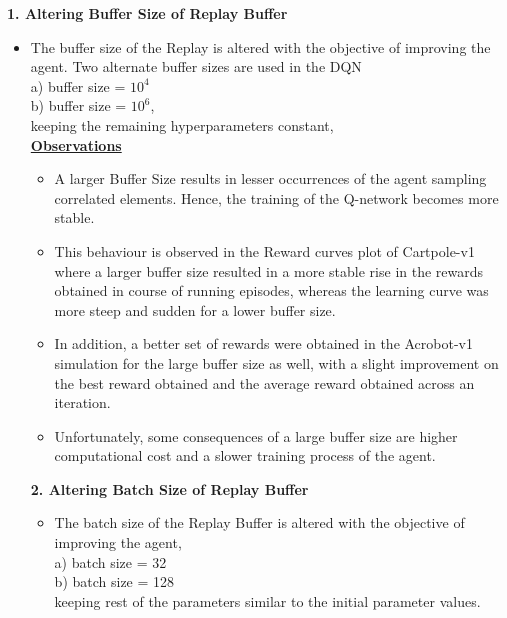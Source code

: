 \documentclass{article}
\begin{document}
    \textbf{ 1. Altering Buffer Size of Replay Buffer} \\
    \begin{itemize}
        \item The buffer size of the Replay is altered with the objective of improving
        the agent. Two alternate buffer sizes are used in the DQN \\
        a) buffer size = $10^4$ \\
        b) buffer size = $10^6$, \\keeping the
        remaining hyperparameters constant,\\


        \textbf{\underline{Observations}}
        \begin{itemize}
            \item A larger Buffer Size results in lesser occurrences of the agent sampling
            correlated elements. Hence, the training of the Q-network becomes more
            stable.
            \item This behaviour is observed in the Reward curves plot of Cartpole-v1 where
            a larger buffer size resulted in a more stable rise in the rewards obtained
            in course of running episodes, whereas the learning curve was more steep
            and sudden for a lower buffer size.
            \item In addition, a better set of rewards were obtained in the Acrobot-v1 simulation for the large buffer size as well, with a slight improvement on the
            best reward obtained and the average reward obtained across an iteration.
            \item Unfortunately, some consequences of a large buffer size are higher computational cost and a slower training process of the agent.
        \end{itemize}

        \textbf{ 2. Altering Batch Size of Replay Buffer} \\
        \begin{itemize}
            \item The batch size of the Replay Buffer is altered with the objective of improving the agent,\\
            a) batch size = 32\\
            b) batch size = 128 \\
            keeping rest of the parameters similar to the initial parameter values. \\
        \end{itemize}


\end{itemize}
\end{document}
